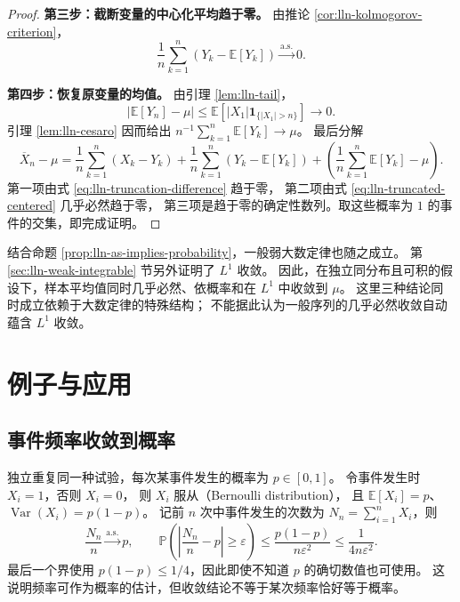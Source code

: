 \documentclass[UTF8]{ctexart}
\begin{document}
\begin{proof}
\textbf{第三步：截断变量的中心化平均趋于零。}
由推论 \ref{cor:lln-kolmogorov-criterion}，
\begin{equation}
  \frac1n\sum_{k=1}^n(Y_k-\mathbb E[Y_k])
  \xrightarrow{\mathrm{a.s.}}0.
  \label{eq:lln-truncated-centered}
\end{equation}

\textbf{第四步：恢复原变量的均值。}
由引理 \ref{lem:lln-tail}，
\[
  |\mathbb E[Y_n]-\mu|
  \leq\mathbb E[|X_1|\mathbf1_{\{|X_1|>n\}}]\longrightarrow0.
\]
引理 \ref{lem:lln-cesaro} 因而给出
$n^{-1}\sum_{k=1}^n\mathbb E[Y_k]\to\mu$。
最后分解
\[
  \overline X_n-\mu
  =\frac1n\sum_{k=1}^n(X_k-Y_k)
   +\frac1n\sum_{k=1}^n(Y_k-\mathbb E[Y_k])
   +\left(\frac1n\sum_{k=1}^n\mathbb E[Y_k]-\mu\right).
\]
第一项由式 \eqref{eq:lln-truncation-difference} 趋于零，
第二项由式 \eqref{eq:lln-truncated-centered} 几乎必然趋于零，
第三项是趋于零的确定性数列。取这些概率为 $1$ 的事件的交集，即完成证明。
\end{proof}

结合命题 \ref{prop:lln-as-implies-probability}，一般弱大数定律也随之成立。
第 \ref{sec:lln-weak-integrable} 节另外证明了 $L^1$ 收敛。
因此，在独立同分布且可积的假设下，样本平均值同时几乎必然、依概率和在 $L^1$ 中收敛到 $\mu$。
这里三种结论同时成立依赖于大数定律的特殊结构；
不能据此认为一般序列的几乎必然收敛自动蕴含 $L^1$ 收敛。

\section{例子与应用}
\label{sec:lln-applications}

\subsection{事件频率收敛到概率}

\begin{example}[伯努利大数定律]
\label{ex:lln-bernoulli}
独立重复同一种试验，每次某事件发生的概率为 $p\in[0,1]$。
令事件发生时 $X_i=1$，否则 $X_i=0$，
则 $X_i$ 服从（Bernoulli distribution），
且 $\mathbb E[X_i]=p$、$\operatorname{Var}(X_i)=p(1-p)$。
记前 $n$ 次中事件发生的次数为 $N_n=\sum_{i=1}^nX_i$，则
\[
  \frac{N_n}{n}\xrightarrow{\mathrm{a.s.}}p,
  \qquad
  \mathbb P\left(\left|\frac{N_n}{n}-p\right|\geq\varepsilon\right)
  \leq\frac{p(1-p)}{n\varepsilon^2}
  \leq\frac1{4n\varepsilon^2}.
\]
最后一个界使用 $p(1-p)\leq1/4$，因此即使不知道 $p$ 的确切数值也可使用。
这说明频率可作为概率的估计，但收敛结论不等于某次频率恰好等于概率。
\end{example}
\end{document}
